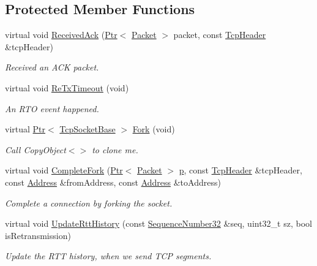 \subsection*{Protected Member Functions}
\begin{DoxyCompactItemize}
\item 
virtual void \hyperlink{classns3_1_1TcpSocketMsgBase_a9e6d6d2050a0e9c8a06a44462a1a7aa7}{Received\+Ack} (\hyperlink{classns3_1_1Ptr}{Ptr}$<$ \hyperlink{classns3_1_1Packet}{Packet} $>$ packet, const \hyperlink{classns3_1_1TcpHeader}{Tcp\+Header} \&tcp\+Header)
\begin{DoxyCompactList}\small\item\em Received an A\+CK packet. \end{DoxyCompactList}\item 
virtual void \hyperlink{classns3_1_1TcpSocketMsgBase_af890d12f15ead128b26ca59b47a14c53}{Re\+Tx\+Timeout} (void)
\begin{DoxyCompactList}\small\item\em An R\+TO event happened. \end{DoxyCompactList}\item 
virtual \hyperlink{classns3_1_1Ptr}{Ptr}$<$ \hyperlink{classns3_1_1TcpSocketBase}{Tcp\+Socket\+Base} $>$ \hyperlink{classns3_1_1TcpSocketMsgBase_a58a2f5803ece6745c5d79d710d01f8ee}{Fork} (void)
\begin{DoxyCompactList}\small\item\em Call Copy\+Object$<$$>$ to clone me. \end{DoxyCompactList}\item 
virtual void \hyperlink{classns3_1_1TcpSocketMsgBase_a1509ce6df2f3e5384889f03b5de06a45}{Complete\+Fork} (\hyperlink{classns3_1_1Ptr}{Ptr}$<$ \hyperlink{classns3_1_1Packet}{Packet} $>$ \hyperlink{lte__link__budget__x2__handover__measures_8m_ac9de518908a968428863f829398a4e62}{p}, const \hyperlink{classns3_1_1TcpHeader}{Tcp\+Header} \&tcp\+Header, const \hyperlink{classns3_1_1Address}{Address} \&from\+Address, const \hyperlink{classns3_1_1Address}{Address} \&to\+Address)
\begin{DoxyCompactList}\small\item\em Complete a connection by forking the socket. \end{DoxyCompactList}\item 
virtual void \hyperlink{classns3_1_1TcpSocketMsgBase_a08ac3b00fadcacfa05a20b24e7cb65cc}{Update\+Rtt\+History} (const \hyperlink{group__network_gacb2070e4e98d2d5135c9bede58f07a03}{Sequence\+Number32} \&seq, uint32\+\_\+t sz, bool is\+Retransmission)
\begin{DoxyCompactList}\small\item\em Update the R\+TT history, when we send T\+CP segments. \end{DoxyCompactList}\end{DoxyCompactItemize}
